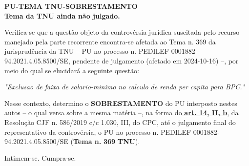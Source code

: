 \documentclass[12pt]{article}
\begin{document}
\justifying
{\Large\bfseries \textbf{PU-TEMA TNU-SOBRESTAMENTO}}\\

\noindent \textbf{Tema da TNU ainda não julgado.}

\noindent Verifica-se que a questão objeto da controvérsia jurídica suscitada pelo recurso manejado pela parte recorrente encontra-se afetada ao Tema n. 369 da jurisprudência da TNU – PU no processo n. PEDILEF 0001882-94.2021.4.05.8500/SE, pendente de julgamento (afetado em 2024-10-16) –, por meio do qual se elucidará a seguinte questão:

\noindent \textit{"Exclusao de faixa de salario-minimo no calculo de renda per capita para BPC."}

\noindent Nesse contexto, determino o \textbf{SOBRESTAMENTO} do PU interposto nestes autos – o qual versa sobre a mesma matéria –, na forma do\uline{\textbf{ art. 14, II, b}}, da Resolução CJF n. 586/2019 c/c 1.030, III, do CPC, até o julgamento final do representativo da controvérsia, o PU no processo n. PEDILEF 0001882-94.2021.4.05.8500/SE (\textbf{Tema n. }\textbf{369 }\textbf{TNU}).

\noindent Intimem-se. Cumpra-se.
\end{document}
